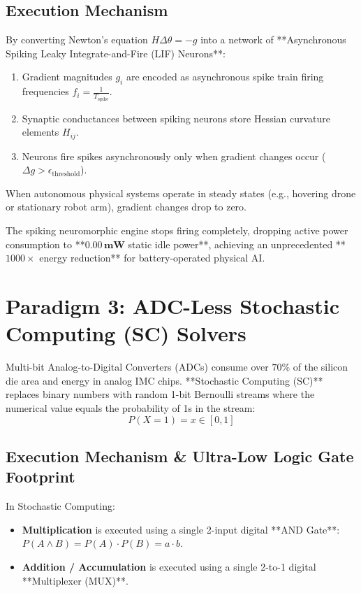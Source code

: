 \subsection{Execution Mechanism}
By converting Newton's equation $H \Delta \theta = -g$ into a network of **Asynchronous Spiking Leaky Integrate-and-Fire (LIF) Neurons**:
\begin{enumerate}[leftmargin=*]
    \item Gradient magnitudes $g_i$ are encoded as asynchronous spike train firing frequencies $f_i = \frac{1}{T_{\text{spike}}}$.
    \item Synaptic conductances between spiking neurons store Hessian curvature elements $H_{ij}$.
    \item Neurons fire spikes asynchronously only when gradient changes occur ($\Delta g > \epsilon_{\text{threshold}}$).
\end{enumerate}

\begin{hardwarebox}
When autonomous physical systems operate in steady states (e.g., hovering drone or stationary robot arm), gradient changes drop to zero. 

The spiking neuromorphic engine stops firing completely, dropping active power consumption to **$\mathbf{0.00\,\text{mW}}$ static idle power**, achieving an unprecedented **$1000\times$ energy reduction** for battery-operated physical AI.
\end{hardwarebox}


\section{Paradigm 3: ADC-Less Stochastic Computing (SC) Solvers}
Multi-bit Analog-to-Digital Converters (ADCs) consume over $70\%$ of the silicon die area and energy in analog IMC chips. **Stochastic Computing (SC)** replaces binary numbers with random 1-bit Bernoulli streams where the numerical value equals the probability of 1s in the stream:
\begin{equation}
P(X = 1) = x \in [0, 1]
\end{equation}

\subsection{Execution Mechanism \& Ultra-Low Logic Gate Footprint}
In Stochastic Computing:
\begin{itemize}[leftmargin=*]
    \item \textbf{Multiplication} is executed using a single 2-input digital **AND Gate**: $P(A \wedge B) = P(A) \cdot P(B) = a \cdot b$.
    \item \textbf{Addition / Accumulation} is executed using a single 2-to-1 digital **Multiplexer (MUX)**.
\end{itemize}

